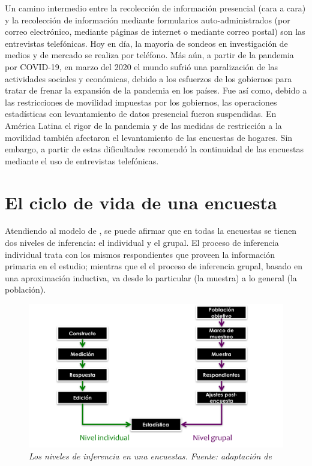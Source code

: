 \documentclass[
  12pt,
]{book}
\begin{document}
Un camino intermedio entre la recolección de información presencial (cara a cara) y la recolección de información mediante formularios auto-administrados (por correo electrónico, mediante páginas de internet o mediante correo postal) son las entrevistas telefónicas. Hoy en día, la mayoría de sondeos en investigación de medios y de mercado se realiza por teléfono. Más aún, a partir de la pandemia por COVID-19, en marzo del 2020 el mundo sufrió una paralización de las actividades sociales y económicas, debido a los esfuerzos de los gobiernos para tratar de frenar la expansión de la pandemia en los países. Fue así como, debido a las restricciones de movilidad impuestas por los gobiernos, las operaciones estadísticas con levantamiento de datos presencial fueron suspendidas. En América Latina el rigor de la pandemia y de las medidas de restricción a la movilidad también afectaron el levantamiento de las encuestas de hogares. Sin embargo, a partir de estas dificultades \citet{CEPAL_continua} recomendó la continuidad de las encuestas mediante el uso de entrevistas telefónicas.

\hypertarget{el-ciclo-de-vida-de-una-encuesta}{%
\section{El ciclo de vida de una encuesta}\label{el-ciclo-de-vida-de-una-encuesta}}

Atendiendo al modelo de \citet{Groves_Fowler_Couper_Lepkowski_Singer_Tourangeau_2009}, se puede afirmar que en todas la encuestas se tienen dos niveles de inferencia: el individual y el grupal. El proceso de inferencia individual trata con los mismos respondientes que proveen la información primaria en el estudio; mientras que el el proceso de inferencia grupal, basado en una aproximación inductiva, va desde lo particular (la muestra) a lo general (la población).

\begin{figure}
\centering
\includegraphics{Pics/Picture6.png}
\caption{\emph{Los niveles de inferencia en una encuestas. Fuente: adaptación de \citet{Groves_Fowler_Couper_Lepkowski_Singer_Tourangeau_2009}}}
\end{figure}
\end{document}
